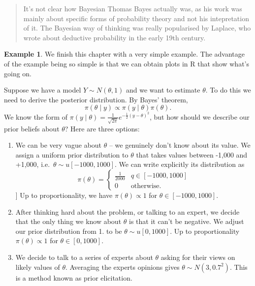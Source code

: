 \documentclass[
]{book}
\theoremstyle{definition}
\theoremstyle{definition}
\newtheorem{example}{Example}[chapter]
\theoremstyle{definition}
\theoremstyle{definition}
\theoremstyle{remark}
\begin{document}
\begin{quote}
It's not clear how Bayesian Thomas Bayes actually was, as his work was mainly about specific forms of probability theory and not his intepretation of it. The Bayesian way of thinking was really popularised by Laplace, who wrote about deductive probability in the early 19th century.
\end{quote}

\begin{example}

We finish this chapter with a very simple example. The advantage of the example being so simple is that we can obtain plots in R that show what's going on.

Suppose we have a model \(Y \sim N(\theta, 1)\) and we want to estimate \(\theta\). To do this we need to derive the posterior distribution. By Bayes' theorem,
\[
\pi(\theta \mid y) \propto \pi(y \mid \theta) \pi(\theta).
\]
We know the form of \(\pi(y \mid \theta) = \frac{1}{\sqrt{2\pi}}e^{-\frac{1}{2}(y - \theta)^2}\), but how should we describe our prior beliefs about \(\theta\)? Here are three options:

\begin{enumerate}
\def\labelenumi{\arabic{enumi}.}
\item
  We can be very vague about \(\theta\) -- we genuinely don't know about its value. We assign a uniform prior distribution to \(\theta\) that takes values between -1,000 and +1,000, i.e.~\(\theta \sim u[-1000, 1000]\). We can write explicitly its distribution as
  \[
   \pi(\theta) =  \begin{cases} 
                   \frac{1}{2000}& q \in [-1000, 1000] \\
                   0 & \textrm{otherwise.}
               \end{cases}
  \]
  {]}
  Up to proportionality, we have \(\pi(\theta) \propto 1\) for \(\theta \in [-1000, 1000]\).
\item
  After thinking hard about the problem, or talking to an expert, we decide that the only thing we know about \(\theta\) is that it can't be negative. We adjust our prior distribution from 1. to be \(\theta \sim u[0, 1000]\). Up to proportionality \(\pi(\theta) \propto 1\) for \(\theta \in [0, 1000]\).
\item
  We decide to talk to a series of experts about \(\theta\) asking for their views on likely values of \(\theta\). Averaging the experts opinions gives \(\theta \sim N(3, 0.7^2)\). This is a method known as prior elicitation.
\end{enumerate}


\end{example}
\end{document}
